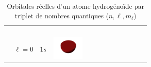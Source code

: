 \begin{landscape}
\begin{xltabular}{\linewidth}{C C C c c c c c c c}
\caption{Orbitales réelles d'un atome hydrogénoïde par triplet de nombres quantiques ($n, \ell, m_{\ell}$)\label{tab:geometrie_orbitale}\cite{Wiki:OA}} 
\\
\toprule

 &  &  \\

\cmidrule(lr){1-2} \cmidrule(lr){4-10} %

 &  & &  &  &  &  \\

\midrule %

\endfirsthead %

\toprule

 &  &  \\

\cmidrule(lr){1-2} \cmidrule(lr){4-10} %

 &  & &  &  &  &  \\

\midrule %

\endhead %
	\addlinespace
	\midrule %
\endfoot %
\endlastfoot %

 &  &  & 
\includegraphics[width=1.6cm]{tableau_geometrie_orbitale_modelisation/S1M0.png} 


\end{xltabular}
\end{landscape}

